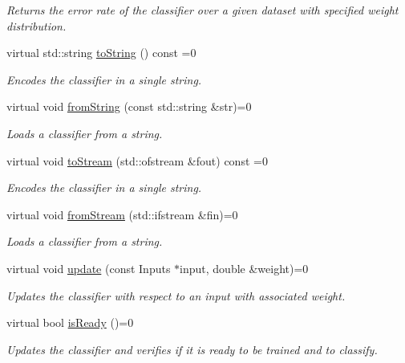 \begin{DoxyCompactItemize}
\begin{DoxyCompactList}\small\item\em Returns the error rate of the classifier over a given dataset with specified weight distribution. \end{DoxyCompactList}\item 
virtual std\+::string \hyperlink{classiCub_1_1boostMIL_1_1WeakClassifier_a980cd41ba074e3bdbfec697e7bee06f0}{to\+String} () const =0
\begin{DoxyCompactList}\small\item\em Encodes the classifier in a single string. \end{DoxyCompactList}\item 
virtual void \hyperlink{classiCub_1_1boostMIL_1_1WeakClassifier_af7011a7e50ca01dea310c3d25fd3a84b}{from\+String} (const std\+::string \&str)=0
\begin{DoxyCompactList}\small\item\em Loads a classifier from a string. \end{DoxyCompactList}\item 
virtual void \hyperlink{classiCub_1_1boostMIL_1_1WeakClassifier_a63b742b5667a287ad2445c85c87714bb}{to\+Stream} (std\+::ofstream \&fout) const =0
\begin{DoxyCompactList}\small\item\em Encodes the classifier in a single string. \end{DoxyCompactList}\item 
virtual void \hyperlink{classiCub_1_1boostMIL_1_1WeakClassifier_ab33627f7dd2c377635f653add1a55107}{from\+Stream} (std\+::ifstream \&fin)=0
\begin{DoxyCompactList}\small\item\em Loads a classifier from a string. \end{DoxyCompactList}\item 
virtual void \hyperlink{classiCub_1_1boostMIL_1_1WeakClassifier_a651a2028d05c812c061a770d1fbe45b7}{update} (const Inputs $\ast$input, double \&weight)=0
\begin{DoxyCompactList}\small\item\em Updates the classifier with respect to an input with associated weight. \end{DoxyCompactList}\item 
virtual bool \hyperlink{classiCub_1_1boostMIL_1_1WeakClassifier_a58f22b59c3308ae58a5d8df4ea5026e1}{is\+Ready} ()=0
\begin{DoxyCompactList}\small\item\em Updates the classifier and verifies if it is ready to be trained and to classify. \end{DoxyCompactList}\item 

\end{DoxyCompactItemize}
